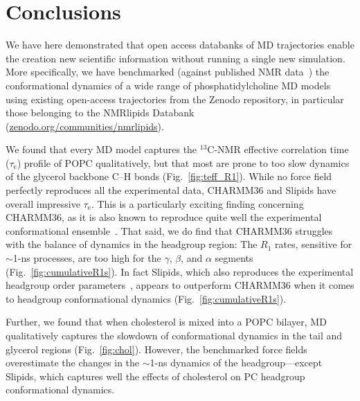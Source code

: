 \documentclass[journal=jcisd8,manuscript=article,layout=twocolumn]{achemso}
\begin{document}
\section{Conclusions}
We have here demonstrated that
open access databanks of MD trajectories enable the creation new scientific information without running a single new simulation.
More specifically, we have bench\-marked (against published NMR data~\cite{ferreira15,pham15,Volke:1995a,Antila:2020a}) the conformational
dynamics of a wide range of phosphatidylcholine MD models using existing open-access trajectories from the Zenodo repository, in particular those belonging to the NMRlipids Databank (\url{zenodo.org/communities/nmrlipids}).

We found that every MD model captures the $^{13}$C-NMR effective correlation time ($\tau_\mathrm e$) profile of POPC qualitatively, %
but that most are prone to too slow dynamics of the glycerol backbone C--H bonds (Fig.~\ref{fig:teff_R1}).
%
While no force field perfectly reproduces all the experimental data,
CHARMM36 and Slipids have overall impressive $\tau_\mathrm e$.
This is a particularly exciting finding concerning CHARMM36,
%
as it is also known to reproduce quite well the experimental conformational ensemble~\cite{botan15}.
%
That said, we do find that CHARMM36 struggles with the balance of dynamics in the headgroup region:
The $R_1$ rates, sensitive for $\sim$1-ns processes, are too high for the $\gamma$, $\beta$, and $\alpha$ segments (Fig.~\ref{fig:cumulativeR1s}).
In fact Slipids, which also
reproduces the experimental headgroup order parameters~\cite{botan15},
appears to outperform CHARMM36 when it comes to headgroup conformational dynamics (Fig.~\ref{fig:cumulativeR1s}).

%
Further, we found that
when cholesterol is mixed into a POPC bilayer,
MD qualitatively captures the slowdown of conformational dynamics in the tail and glycerol regions (Fig.~\ref{fig:chol}). However, the benchmarked force fields overestimate the changes in the $\sim$1-ns dynamics of the headgroup---except
%
Slipids, which captures well the effects of cholesterol on PC headgroup conformational dynamics.
\end{document}
